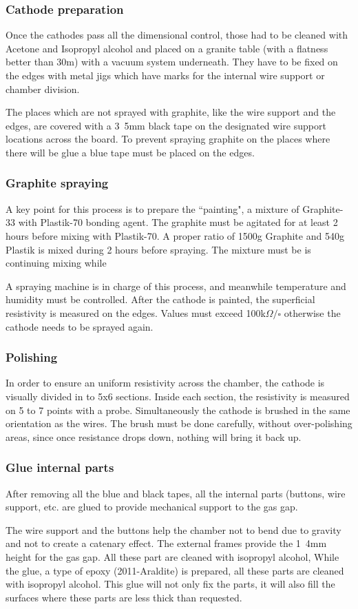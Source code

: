 \subsubsection{Cathode preparation}
Once the cathodes pass all the dimensional control, those had to be cleaned with Acetone and Isopropyl alcohol and placed on a
granite table (with a flatness  better than 30\micro m) with a vacuum system underneath. They have to be fixed on the edges with
metal jigs which have marks for the internal wire support or chamber division.\par
The places which are not sprayed with graphite, like the wire support and the edges, are covered with a \unit{3.5}{mm}
black tape on the designated wire support locations across the board. To prevent spraying graphite on the places where
there will be glue a blue tape must be placed on the edges.

\subsubsection{Graphite spraying}
A key point for this process is to prepare the ``painting", a mixture of Graphite-33 with Plastik-70 bonding agent. The
graphite must be agitated for at least 2 hours before mixing with Plastik-70. A proper ratio of 1500g Graphite and 540g
Plastik is mixed during 2 hours before spraying. The mixture must be is continuing mixing while \par
A spraying machine is in charge of this process, and meanwhile
temperature and humidity must be controlled. 
After the cathode is painted, the superficial resistivity is measured on the
edges. Values must exceed \unit{100}{k$\Omega/\square$} otherwise the cathode needs to be sprayed again.\par


\subsubsection{Polishing}
In order to ensure an uniform resistivity across the chamber, the cathode is visually divided in to 5x6 sections. Inside
each section, the resistivity is measured on 5 to 7 points with a probe. Simultaneously the cathode is brushed in the
same orientation as the wires. The brush must be done carefully, without over-polishing areas, since once resistance
drops down, nothing will bring it back up. 


\subsubsection{Glue internal parts}
After removing all the blue and black tapes, all the internal parts (buttons, wire support, etc. are glued to provide mechanical support to the gas gap.\par
The wire support and the buttons help the chamber not to bend due to gravity and not to create a catenary effect.
The external frames provide the \unit{1.4}{mm} height for the gas gap. 
All these part are cleaned with isopropyl alcohol, 
While the glue, a type of epoxy (2011-Araldite) is prepared, all these parts are cleaned with isopropyl alcohol.
This glue will not only fix the parts, it will also fill the surfaces where these parts are less thick than requested.



